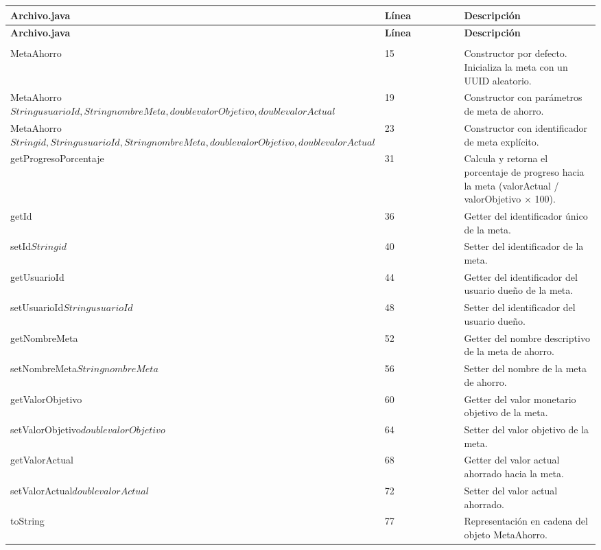 \documentclass[utf8]{article}
\begin{document}
\begin{longtable}{p{0.18\linewidth}p{0.32\linewidth}p{0.5\linewidth}}
\hline
\textbf{Archivo.java} & \textbf{Línea} & \textbf{Descripción} \\ \hline
\endfirsthead
\hline
\textbf{Archivo.java} & \textbf{Línea} & \textbf{Descripción} \\ \hline
\endhead
\hline
\endfoot
\hline
\endlastfoot
\endlastfoot}
\textbf{MetaAhorro.java} & & \\ \hline
MetaAhorro\(\) & 15 & Constructor por defecto. Inicializa la meta con un UUID aleatorio. \\
MetaAhorro\(String usuarioId, String nombreMeta, double valorObjetivo, double valorActual\) & 19 & Constructor con parámetros de meta de ahorro. \\
MetaAhorro\(String id, String usuarioId, String nombreMeta, double valorObjetivo, double valorActual\) & 23 & Constructor con identificador de meta explícito. \\
getProgresoPorcentaje\(\) & 31 & Calcula y retorna el porcentaje de progreso hacia la meta (valorActual / valorObjetivo × 100). \\
getId\(\) & 36 & Getter del identificador único de la meta. \\
setId\(String id\) & 40 & Setter del identificador de la meta. \\
getUsuarioId\(\) & 44 & Getter del identificador del usuario dueño de la meta. \\
setUsuarioId\(String usuarioId\) & 48 & Setter del identificador del usuario dueño. \\
getNombreMeta\(\) & 52 & Getter del nombre descriptivo de la meta de ahorro. \\
setNombreMeta\(String nombreMeta\) & 56 & Setter del nombre de la meta de ahorro. \\
getValorObjetivo\(\) & 60 & Getter del valor monetario objetivo de la meta. \\
setValorObjetivo\(double valorObjetivo\) & 64 & Setter del valor objetivo de la meta. \\
getValorActual\(\) & 68 & Getter del valor actual ahorrado hacia la meta. \\
setValorActual\(double valorActual\) & 72 & Setter del valor actual ahorrado. \\
toString\(\) & 77 & Representación en cadena del objeto MetaAhorro. \\
\end{longtable}
\end{document}
